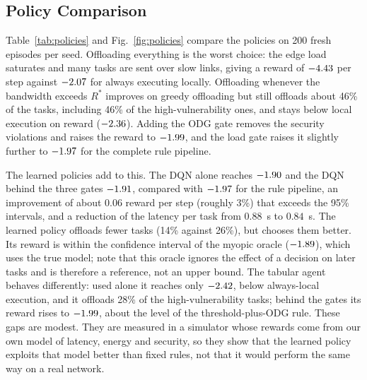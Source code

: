 \documentclass{ieeeaccess}
\begin{document}
\subsection{Policy Comparison}
Table~\ref{tab:policies} and Fig.~\ref{fig:policies} compare the policies on 200 fresh episodes per seed. Offloading everything is the worst choice: the edge load saturates and many tasks are sent over slow links, giving a reward of $-4.43$ per step against $-2.07$ for always executing locally. Offloading whenever the bandwidth exceeds $R^{*}$ improves on greedy offloading but still offloads about 46\% of the tasks, including 46\% of the high-vulnerability ones, and stays below local execution on reward ($-2.36$). Adding the ODG gate removes the security violations and raises the reward to $-1.99$, and the load gate raises it slightly further to $-1.97$ for the complete rule pipeline.

The learned policies add to this. The DQN alone reaches $-1.90$ and the DQN behind the three gates $-1.91$, compared with $-1.97$ for the rule pipeline, an improvement of about 0.06 reward per step (roughly 3\%) that exceeds the 95\% intervals, and a reduction of the latency per task from $0.88$~s to $0.84$~s. The learned policy offloads fewer tasks (14\% against 26\%), but chooses them better. Its reward is within the confidence interval of the myopic oracle ($-1.89$), which uses the true model; note that this oracle ignores the effect of a decision on later tasks and is therefore a reference, not an upper bound. The tabular agent behaves differently: used alone it reaches only $-2.42$, below always-local execution, and it offloads 28\% of the high-vulnerability tasks; behind the gates its reward rises to $-1.99$, about the level of the threshold-plus-ODG rule. These gaps are modest. They are measured in a simulator whose rewards come from our own model of latency, energy and security, so they show that the learned policy exploits that model better than fixed rules, not that it would perform the same way on a real network.

\begin{table}[t]
\caption{Comparison of offloading policies, mean $\pm$ 95\% confidence interval over \NSeeds{} seeds (200 evaluation episodes per seed). Reward, latency and energy are per task; ``Offloaded'' is the share of tasks sent to the edge; ``High-vuln.\ offl.'' is the share of tasks with vulnerability $\ge0.66$ that were offloaded; ``Depleted'' is the share of episodes in which the battery reached zero. ``Gates'' means the bandwidth, ODG and load gates of Fig.~\ref{fig:pipeline}. The myopic oracle is a reference that uses the true model.}
\label{tab:policies}
\centering
\footnotesize

\end{table}
\end{document}
